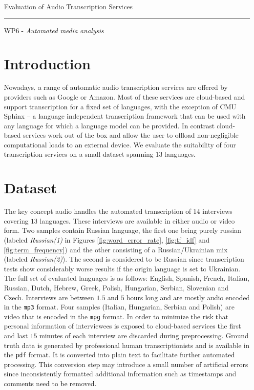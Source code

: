 \documentclass[11pt]{article}
\begin{document}
\huge{Evaluation of Audio Transcription Services}
\vspace{1mm}
\hrule
\vspace{2mm}
\large{WP6 - \textit{Automated media analysis}}
\vspace{5mm}

\section{Introduction}

Nowadays, a range of automatic audio transcription services are offered by providers such as Google or Amazon.
Most of these services are cloud-based and support transcription for a fixed set of languages, with the exception of CMU Sphinx -- a language independent transcription framework that can be used with any language for which a language model can be provided.
In contrast cloud-based services work out of the box and allow the user to offload non-negligible computational loads to an external device.
We evaluate the suitability of four transcription services on a small dataset spanning $13$ languages. 

\section{Dataset}

The key concept audio handles the automated transcription of $14$ interviews covering $13$ languages.
These interviews are available in either audio or video form.
Two samples contain Russian language, the first one being purely russian (labeled \textit{Russian(1)} in Figures \ref{fig:word_error_rate}, \ref{fig:tf_idf} and \ref{fig:term_frequency}) and the other consisting of a Russian/Ukrainian mix (labeled \textit{Russian(2)}).
The second is considered to be Russian since transcription tests show considerably worse results if the origin language is set to Ukrainian.
The full set of evaluated languages is as follows: English, Spanish, French, Italian, Russian, Dutch, Hebrew, Greek, Polish, Hungarian, Serbian, Slovenian and Czech.
Interviews are between $1.5$ and $5$ hours long and are mostly audio encoded in the \texttt{mp3} format.
Four samples (Italian, Hungarian, Serbian and Polish) are video that is encoded in the \texttt{mpg} format.
In order to minimize the risk that personal information of interviewees is exposed to cloud-based services the first and last $15$ minutes of each interview are discarded during preprocessing.
Ground truth data is generated by professional human transcriptionists and is available in the \texttt{pdf} format.
It is converted into plain text to facilitate further automated processing. 
This conversion step may introduce a small number of artificial errors since inconsistently formatted additional information such as timestamps and comments need to be removed.
\end{document}

